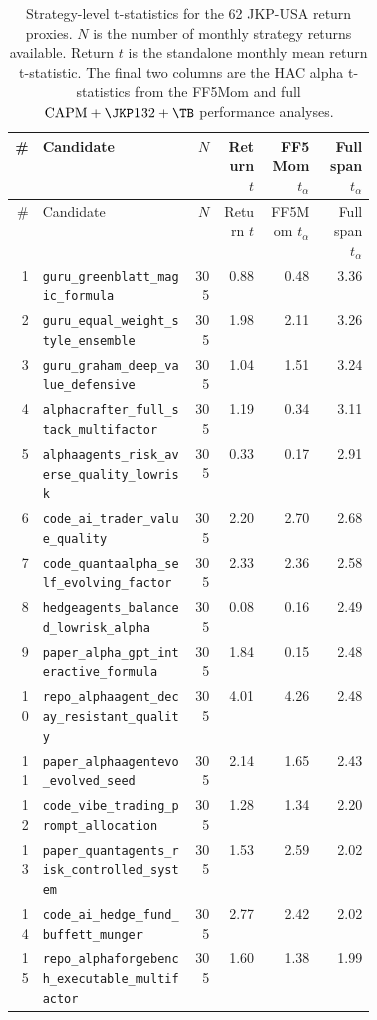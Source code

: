 \begin{scriptsize}
\begin{longtable}{r>{\raggedright\arraybackslash}p{0.42\linewidth}rrrr}
\caption{Strategy-level t-statistics for the 62 JKP-USA return proxies.  $N$ is the number of monthly strategy returns available.  Return $t$ is the standalone monthly mean return t-statistic.  The final two columns are the HAC alpha t-statistics from the FF5Mom and full $\mathrm{CAPM}+\JKP132+\TB$ performance analyses.}\label{tab:strategy-tstats}\\
\toprule
\# & Candidate & $N$ & Return $t$ & FF5Mom $t_{\alpha}$ & Full span $t_{\alpha}$\\
\midrule
\endfirsthead
\toprule
\# & Candidate & $N$ & Return $t$ & FF5Mom $t_{\alpha}$ & Full span $t_{\alpha}$\\
\midrule
\endhead
1 & \nolinkurl{guru_greenblatt_magic_formula} & 305 & 0.88 & 0.48 & 3.36\\
2 & \nolinkurl{guru_equal_weight_style_ensemble} & 305 & 1.98 & 2.11 & 3.26\\
3 & \nolinkurl{guru_graham_deep_value_defensive} & 305 & 1.04 & 1.51 & 3.24\\
4 & \nolinkurl{alphacrafter_full_stack_multifactor} & 305 & 1.19 & 0.34 & 3.11\\
5 & \nolinkurl{alphaagents_risk_averse_quality_lowrisk} & 305 & 0.33 & 0.17 & 2.91\\
6 & \nolinkurl{code_ai_trader_value_quality} & 305 & 2.20 & 2.70 & 2.68\\
7 & \nolinkurl{code_quantaalpha_self_evolving_factor} & 305 & 2.33 & 2.36 & 2.58\\
8 & \nolinkurl{hedgeagents_balanced_lowrisk_alpha} & 305 & 0.08 & 0.16 & 2.49\\
9 & \nolinkurl{paper_alpha_gpt_interactive_formula} & 305 & 1.84 & 0.15 & 2.48\\
10 & \nolinkurl{repo_alphaagent_decay_resistant_quality} & 305 & 4.01 & 4.26 & 2.48\\
11 & \nolinkurl{paper_alphaagentevo_evolved_seed} & 305 & 2.14 & 1.65 & 2.43\\
12 & \nolinkurl{code_vibe_trading_prompt_allocation} & 305 & 1.28 & 1.34 & 2.20\\
13 & \nolinkurl{paper_quantagents_risk_controlled_system} & 305 & 1.53 & 2.59 & 2.02\\
14 & \nolinkurl{code_ai_hedge_fund_buffett_munger} & 305 & 2.77 & 2.42 & 2.02\\
15 & \nolinkurl{repo_alphaforgebench_executable_multifactor} & 305 & 1.60 & 1.38 & 1.99\\

\end{longtable}
\end{scriptsize}
